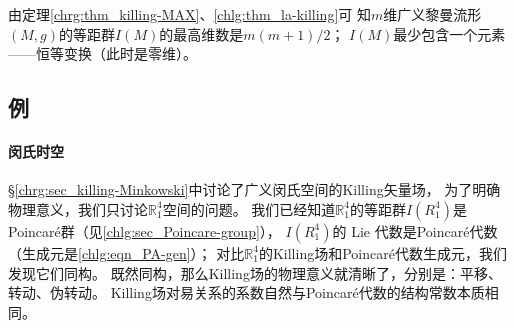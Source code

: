 \begin{remark}
	由定理\ref{chrg:thm_killing-MAX}、\ref{chlg:thm_la-killing}可
	知$m$维广义黎曼流形$(M,g)$的等距群$I(M)$的最高维数是$m(m+1)/2$；
	$I(M)$最少包含一个元素——恒等变换（此时是零维）。
\end{remark}








\subsection{例}\label{chlg:sec_killing-example}

\paragraph{闵氏时空}
\S\ref{chrg:sec_killing-Minkowski}中讨论了广义闵氏空间的Killing矢量场，
为了明确物理意义，我们只讨论$\mathbb{R}^4_1$空间的问题。
我们已经知道$\mathbb{R}^4_1$的等距群$I({R}^4_1)$是Poincar\'{e}群（见\ref{chlg:sec_Poincare-group}），
$I({R}^4_1)$的 Lie 代数是Poincar\'{e}代数（生成元是\eqref{chlg:eqn_PA-gen}）；
对比$\mathbb{R}^4_1$的Killing场和Poincar\'{e}代数生成元，我们发现它们同构。
既然同构，那么Killing场的物理意义就清晰了，分别是：平移、转动、伪转动。
Killing场对易关系的系数自然与Poincar\'{e}代数的结构常数本质相同。



